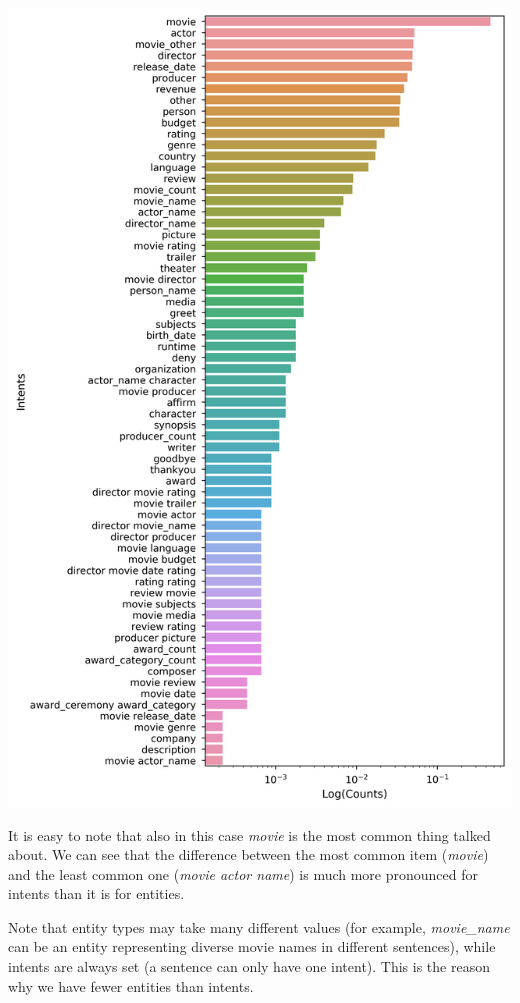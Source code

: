\documentclass[11pt,a4paper]{article}
\begin{document}
		\hspace*{-1.7cm}\includegraphics[scale=0.5]{intents_frequency}
		
		It is easy to note that also in this case \textit{movie} is the most common thing talked about. We can see that the difference between the most common item (\textit{movie}) and the least common one (\textit{movie actor name}) is much more pronounced for intents than it is for entities.
		
		Note that entity types may take many different values (for example, \textit{movie\_name} can be an entity representing diverse movie names in different sentences), while intents are always set (a sentence can only have one intent). This is the reason why we have fewer entities than intents.
		
\end{document}
